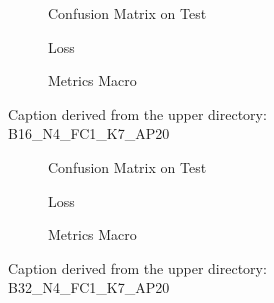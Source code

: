 \begin{figure}
    \centering
    \begin{subfigure}{0.3\linewidth}
        \centering
        
        \caption{Confusion Matrix on Test}
        \label{fig:confMatrixTest-8}
    \end{subfigure}
    \begin{subfigure}{0.3\linewidth}
        \centering
        
        \caption{Loss}
        \label{fig:loss-8}
    \end{subfigure}
    \begin{subfigure}{0.3\linewidth}
        \centering
        
        \caption{Metrics Macro}
        \label{fig:metricsMacro-8}
    \end{subfigure}

    \caption{Caption derived from the upper directory: B16\_N4\_FC1\_K7\_AP20}
    \label{fig:overallCaption-8}
\end{figure}


\begin{figure}
    \centering
    \begin{subfigure}{0.3\linewidth}
        \centering
        
        \caption{Confusion Matrix on Test}
        \label{fig:confMatrixTest-9}
    \end{subfigure}
    \begin{subfigure}{0.3\linewidth}
        \centering
        
        \caption{Loss}
        \label{fig:loss-9}
    \end{subfigure}
    \begin{subfigure}{0.3\linewidth}
        \centering
        
        \caption{Metrics Macro}
        \label{fig:metricsMacro-9}
    \end{subfigure}

    \caption{Caption derived from the upper directory: B32\_N4\_FC1\_K7\_AP20}
    \label{fig:overallCaption-9}
\end{figure}


